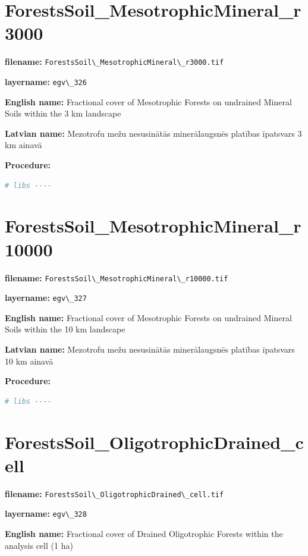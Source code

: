 \documentclass[
]{book}
\newcommand{\passthrough}[1]{#1}
\begin{document}
\section{ForestsSoil\_MesotrophicMineral\_r3000}\label{ch06.326}

\textbf{filename:} \passthrough{\lstinline!ForestsSoil\_MesotrophicMineral\_r3000.tif!}

\textbf{layername:} \passthrough{\lstinline!egv\_326!}

\textbf{English name:} Fractional cover of Mesotrophic Forests on undrained Mineral Soils within the 3 km landscape

\textbf{Latvian name:} Mezotrofu mežu nesusinātās minerālaugsnēs platības īpatsvars 3 km ainavā

\textbf{Procedure:}

\begin{lstlisting}[language=R]
# libs ----
\end{lstlisting}

\section{ForestsSoil\_MesotrophicMineral\_r10000}\label{ch06.327}

\textbf{filename:} \passthrough{\lstinline!ForestsSoil\_MesotrophicMineral\_r10000.tif!}

\textbf{layername:} \passthrough{\lstinline!egv\_327!}

\textbf{English name:} Fractional cover of Mesotrophic Forests on undrained Mineral Soils within the 10 km landscape

\textbf{Latvian name:} Mezotrofu mežu nesusinātās minerālaugsnēs platības īpatsvars 10 km ainavā

\textbf{Procedure:}

\begin{lstlisting}[language=R]
# libs ----
\end{lstlisting}

\section{ForestsSoil\_OligotrophicDrained\_cell}\label{ch06.328}

\textbf{filename:} \passthrough{\lstinline!ForestsSoil\_OligotrophicDrained\_cell.tif!}

\textbf{layername:} \passthrough{\lstinline!egv\_328!}

\textbf{English name:} Fractional cover of Drained Oligotrophic Forests within the analysis cell (1 ha)
\end{document}
